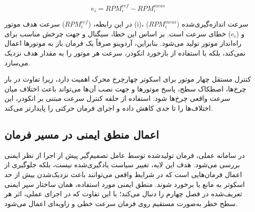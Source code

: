 \begin{equation}
	e_i = RPM^{ref}_i - RPM^{meas}_i
	\label{eq:real_motor_rpm_error}
\end{equation}

در این رابطه، ($RPM^{ref}_i$) سرعت هدف موتور (i)، ($RPM^{meas}_i$) سرعت اندازه‌گیری‌شده و ($e_i$) خطای سرعت است. بر اساس این خطا، سیگنال  و جهت چرخش مناسب برای راه‌انداز موتور تولید می‌شود. بنابراین، آردوینو صرفاً یک فرمان باز به موتورها اعمال نمی‌کند، بلکه با استفاده از بازخورد انکودر، سرعت هر موتور را به مقدار هدف نزدیک می‌سازد.

کنترل مستقل چهار موتور برای اسکوتر چهارچرخ محرک اهمیت دارد، زیرا تفاوت در بار چرخ‌ها، اصطکاک سطح، پاسخ موتورها و جهت نصب آن‌ها می‌تواند باعث اختلاف میان سرعت واقعی چرخ‌ها شود. استفاده از حلقه کنترل سرعت مبتنی بر انکودر، این اختلاف‌ها را تا حدی کاهش داده و اجرای فرمان حرکتی را پایدارتر می‌کند.

\subsection{اعمال منطق ایمنی در مسیر فرمان}
\label{subsec:real_safety_logic_execution}

در سامانه عملی، فرمان تولیدشده توسط عامل تصمیم‌گیر پیش از اجرا از نظر ایمنی بررسی می‌شود. هدف این لایه، تغییر سیاست یادگیری‌شده نیست، بلکه جلوگیری از اعمال فرمان‌هایی است که در شرایط واقعی می‌توانند باعث نزدیک‌شدن بیش از حد اسکوتر به مانع یا برخورد شوند. منطق ایمنی مورد استفاده، همان ساختار سپر ایمنی تعریف‌شده در فصل چهارم را دنبال می‌کند؛ با این تفاوت که در اجرای عملی، اثر هر سطح خطر به‌صورت مستقیم روی فرمان سرعت خطی و زاویه‌ای اعمال می‌شود.

